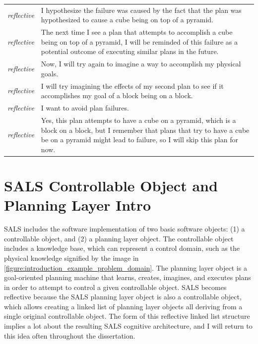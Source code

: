 \begin{tabular}{p{2cm}p{8cm}}
  {\emph{reflective}} & I hypothesize the failure was caused by the
  fact that the plan was hypothesized to cause a cube being on top of
  a pyramid. \\
  
  {\emph{reflective}} & The next time I see a plan that attempts to
  accomplish a cube being on top of a pyramid, I will be reminded of
  this failure as a potential outcome of executing similar plans in
  the future. \\
  
  {\emph{reflective}} & Now, I will try again to imagine a way to
  accomplish my physical goals. \\
  
  {\emph{reflective}} & I will try imagining the effects of my second
  plan to see if it accomplishes my goal of a block being on a
  block. \\
  
  {\emph{reflective}} & I want to avoid plan failures. \\
  
  {\emph{reflective}} & Yes, this plan attempts to have a cube on a
  pyramid, which is a block on a block, but I remember that plans that
  try to have a cube be on a pyramid might lead to failure, so I will
  skip this plan for now. \\
\end{tabular}






\section{SALS Controllable Object and Planning Layer Intro}

SALS includes the software implementation of two basic software
objects: (1) a controllable object, and (2) a planning layer object.
The controllable object includes a knowledge base, which can represent
a control domain, such as the physical knowledge signified by the
image in {\autoref{figure:introduction_example_problem_domain}}.
The planning layer object is a goal-oriented planning machine that
learns, creates, imagines, and executes plans in order to attempt to
control a given controllable object.  SALS becomes reflective because
the SALS planning layer object is also a controllable object, which
allows creating a linked list of planning layer objects all deriving
from a single original controllable object.  The form of this
reflective linked list structure implies a lot about the resulting
SALS cognitive architecture, and I will return to this idea often
throughout the dissertation.













